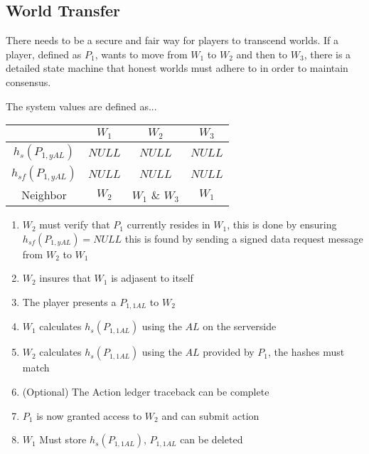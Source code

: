 \documentclass[runningheads,a4paper]{llncs}
\begin{document}
\subsection{World Transfer} 
There needs to be a secure and fair way for players to transcend worlds. If a player, defined as $P_1$, wants to move from $W_1$ to $W_2$ and then to $W_3$, there is a detailed state machine that honest worlds must adhere to in order to maintain consensus. 

\begin{center}
\end{center}
The system values are defined as...
\begin{center}
\begin{tabular}{ c|c c c }
& $W_1$ & $W_2$ & $W_3$ \\
\hline 
$h_s(P_{1,yAL})$ & $NULL$ & $NULL$ & $NULL$ \\ 
$h_{sf}(P_{1,yAL})$ & $NULL$ & $NULL$ & $NULL$ \\ 
Neighbor & $W_2$ & $W_1$ \& $W_3$ & $W_1$\\
\end{tabular}
\end{center}

\begin{enumerate}
\item $W_2$ must verify that $P_1$ currently resides in $W_1$, this is done by ensuring $h_{sf}(P_{1,yAL}) = NULL$ this is found by sending a signed data request message from $W_2$ to $W_1$ 
\item $W_2$ insures that $W_1$ is adjasent to itself
\item The player presents a $P_{1,1AL}$ to $W_2$
\item $W_1$ calculates $h_s(P_{1,1AL})$ using the $AL$ on the serverside
\item $W_2$ calculates $h_s(P_{1,1AL})$ using the $AL$ provided by $P_1$, the hashes must match
\item (Optional) The Action ledger traceback can be complete
\item $P_1$ is now granted access to $W_2$ and can submit action 
\item $W_1$ Must store $h_s(P_{1,1AL})$, $P_{1,1AL}$ can be deleted
\end{enumerate}
\end{document}
